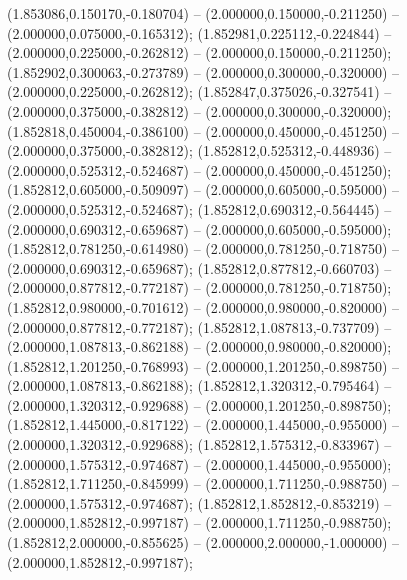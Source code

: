  (1.853086,0.150170,-0.180704) -- (2.000000,0.150000,-0.211250) -- (2.000000,0.075000,-0.165312);
 (1.852981,0.225112,-0.224844) -- (2.000000,0.225000,-0.262812) -- (2.000000,0.150000,-0.211250);
 (1.852902,0.300063,-0.273789) -- (2.000000,0.300000,-0.320000) -- (2.000000,0.225000,-0.262812);
 (1.852847,0.375026,-0.327541) -- (2.000000,0.375000,-0.382812) -- (2.000000,0.300000,-0.320000);
 (1.852818,0.450004,-0.386100) -- (2.000000,0.450000,-0.451250) -- (2.000000,0.375000,-0.382812);
 (1.852812,0.525312,-0.448936) -- (2.000000,0.525312,-0.524687) -- (2.000000,0.450000,-0.451250);
 (1.852812,0.605000,-0.509097) -- (2.000000,0.605000,-0.595000) -- (2.000000,0.525312,-0.524687);
 (1.852812,0.690312,-0.564445) -- (2.000000,0.690312,-0.659687) -- (2.000000,0.605000,-0.595000);
 (1.852812,0.781250,-0.614980) -- (2.000000,0.781250,-0.718750) -- (2.000000,0.690312,-0.659687);
 (1.852812,0.877812,-0.660703) -- (2.000000,0.877812,-0.772187) -- (2.000000,0.781250,-0.718750);
 (1.852812,0.980000,-0.701612) -- (2.000000,0.980000,-0.820000) -- (2.000000,0.877812,-0.772187);
 (1.852812,1.087813,-0.737709) -- (2.000000,1.087813,-0.862188) -- (2.000000,0.980000,-0.820000);
 (1.852812,1.201250,-0.768993) -- (2.000000,1.201250,-0.898750) -- (2.000000,1.087813,-0.862188);
 (1.852812,1.320312,-0.795464) -- (2.000000,1.320312,-0.929688) -- (2.000000,1.201250,-0.898750);
 (1.852812,1.445000,-0.817122) -- (2.000000,1.445000,-0.955000) -- (2.000000,1.320312,-0.929688);
 (1.852812,1.575312,-0.833967) -- (2.000000,1.575312,-0.974687) -- (2.000000,1.445000,-0.955000);
 (1.852812,1.711250,-0.845999) -- (2.000000,1.711250,-0.988750) -- (2.000000,1.575312,-0.974687);
 (1.852812,1.852812,-0.853219) -- (2.000000,1.852812,-0.997187) -- (2.000000,1.711250,-0.988750);
 (1.852812,2.000000,-0.855625) -- (2.000000,2.000000,-1.000000) -- (2.000000,1.852812,-0.997187);
